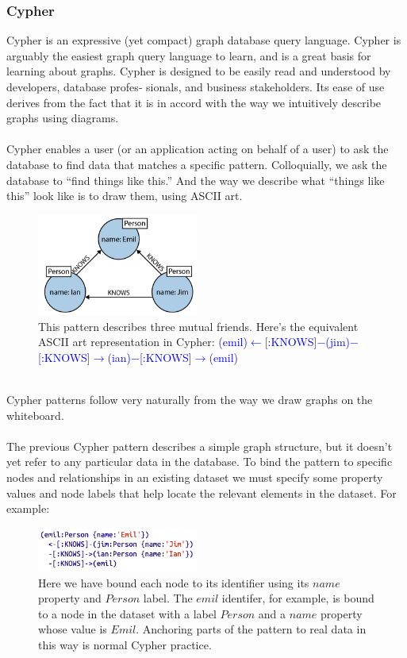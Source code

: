 \documentclass[10pt,a4paper]{article}
\newcommand{\nline}{\\~\\}
\begin{document}
\subsubsection{Cypher}
Cypher is an expressive (yet compact) graph database query language. Cypher is arguably the easiest graph query language to learn, and is a great basis for learning about graphs. Cypher is designed to be easily read and understood by developers, database profes‐ sionals, and business stakeholders. Its ease of use derives from the fact that it is in accord with the way we intuitively describe graphs using diagrams. 
\nline
Cypher enables a user (or an application acting on behalf of a user) to ask the database to find data that matches a specific pattern. Colloquially, we ask the database to “find things like this.” And the way we describe what “things like this” look like is to draw them, using ASCII art.
\begin{figure}[h!]
 \hfill \includegraphics[width=150pt]{images/cypher-pattern.png}\hspace*{\fill}
  \caption{This pattern describes three mutual friends. Here’s the equivalent ASCII art representation in Cypher: \textcolor{blue}{(emil)$\leftarrow$[:KNOWS]$-$(jim)$-$[:KNOWS]$\rightarrow$(ian)$-$[:KNOWS]$\rightarrow$(emil)}
}
\end{figure}  \\
Cypher patterns follow very naturally from the way we draw graphs on the whiteboard.
\nline
The previous Cypher pattern describes a simple graph structure, but it doesn’t yet refer to any particular data in the database. To bind the pattern to specific nodes and relationships in an existing dataset we must specify some property values and node labels that help locate the relevant elements in the dataset. For example:

\begin{figure}[h!]
 \hfill \includegraphics[width=150pt]{images/cypher-pattern2.png}\hspace*{\fill}
  \caption{Here we have bound each node to its identifier using its $name$ property and $Person$ label. The $emil$ identifer, for example, is bound to a node in the dataset with a label $Person$ and a $name$ property whose value is $Emil$. Anchoring parts of the pattern to real data in this way is normal Cypher practice.}
\end{figure} 
\end{document}

